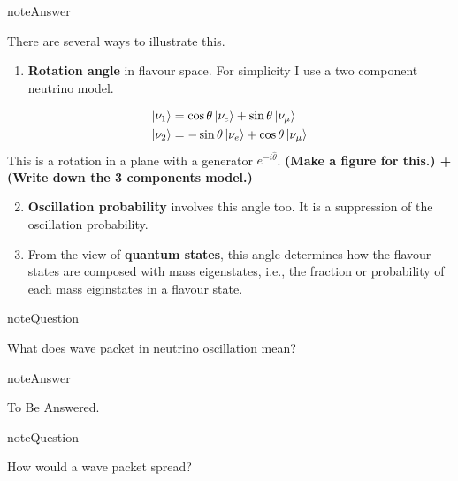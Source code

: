 \documentclass[letterpaper,12pt,english]{sphinxmanual}
\newcommand{\ket}[1]{\left| #1\right\rangle}
\begin{document}
\begin{notice}{note}{Answer}

There are several ways to illustrate this.
\begin{enumerate}
\item {} 
\textbf{Rotation angle} in flavour space. For simplicity I use a two component neutrino model.

\end{enumerate}
\begin{gather}
\begin{split}\ket{\nu_1} &= \cos\theta \ket{\nu_e} + \sin \theta \ket{\nu_\mu} \\
\ket{\nu_2} & = -\sin\theta \ket{\nu_e} + \cos\theta \ket{\nu_\mu}\end{split}\notag
\end{gather}
This is a rotation in a plane with a generator \(e^{-i\hat \theta}\). \textbf{(Make a figure for this.) + (Write down the 3 components model.)}
\begin{enumerate}
\setcounter{enumi}{1}
\item {} 
\textbf{Oscillation probability} involves this angle too. It is a suppression of the oscillation probability.

\item {} 
From the view of \textbf{quantum states}, this angle determines how the flavour states are composed with mass eigenstates, i.e., the fraction or probability of each mass eiginstates in a flavour state.

\end{enumerate}
\end{notice}

\begin{notice}{note}{Question}

What does wave packet in neutrino oscillation mean?
\end{notice}

\begin{notice}{note}{Answer}

To Be Answered.
\end{notice}

\begin{notice}{note}{Question}

How would a wave packet spread?
\end{notice}
\end{document}

